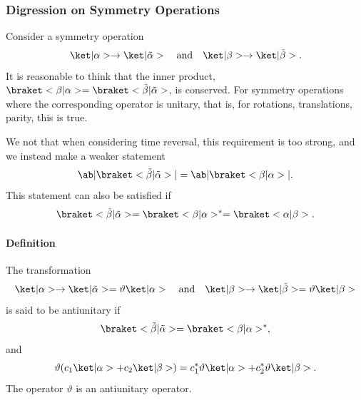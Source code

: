 \subsubsection{Digression on Symmetry Operations}
Consider a symmetry operation
\begin{equation}
    \k{\alpha} \to \k{\tilde{\alpha}} \mand \k{\beta}\to\k{\tilde{\beta}}.
\end{equation}
It is reasonable to think that the inner product, $\bk{\beta}{\alpha} = \bk{\tilde{\beta}}{\tilde{\alpha}}$, is conserved. For symmetry operations where the corresponding operator is unitary, that is, for rotations, translations, parity, this is true.

We not that when considering time reversal, this requirement is too strong, and we instead make a weaker statement
\begin{equation}
    \abs{\bk{\tilde{\beta}}{\tilde{\alpha}}} = \abs{\bk{\beta}{\alpha}}.
\end{equation}
This statement can also be satisfied if 
\begin{equation}
    \bk{\tilde{\beta}}{\tilde{\alpha}} = \bk{\beta}{\alpha}^* = \bk{\alpha}{\beta}.
\end{equation}

\paragraph{Definition} The transformation 
\begin{equation}
    \k{\alpha} \to \k{\tilde{\alpha}} = \vartheta\k{\alpha} \mand \k{\beta} \to \k{\tilde{\beta}} = \vartheta\k{\beta}
\end{equation}
is said to be antiunitary if
\begin{equation}
    \bk{\tilde{\beta}}{\tilde{\alpha}} = \bk{\beta}{\alpha}^*,
\end{equation}
and
\begin{equation}
    \vartheta(c_1\k{\alpha} + c_2 \k{\beta}) = c_1^*\vartheta\k{\alpha} + c_2^* \vartheta\k{\beta}.
\end{equation}
The operator $\vartheta$ is an antiunitary operator. 

